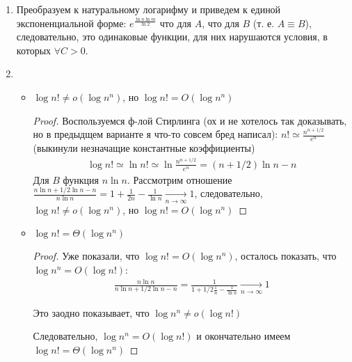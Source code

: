 \begin{enumerate}
\begin{itemize}
\begin{proof}
            Рассмотрим $\frac{2^{n/2}}{2^n} = 2^{-n/2}\xrightarrow[n\to\infty]{}0 \Longrightarrow 2^{n/2}=o(2^n) \Longrightarrow 2^n=\omega(2^{n/2})$ 
        \end{proof}
        \item $2^n=\Omega(2^{n/2})$
        \begin{proof}
            Так как $2^n=\omega(2^{n/2})$, то $2^n=\Omega(2^{n/2})$
        \end{proof}
    \end{itemize}
    \item Преобразуем к натуральному логарифму и приведем к единой экспоненциальной форме: $e^{\frac{\ln n \ln m}{\ln 2}}$ что для $A$, что для $B$ (т. е. $A\equiv B$), следовательно, это одинаковые функции, для них нарушаются условия, в которых $\forall C>0$.
    \item 
    \begin{itemize}
        \item $\log n! \neq o(\log n^n)$, но $\log n! = O(\log n^n)$
        \begin{proof}
            Воспользуемся ф-лой Стирлинга (ох и не хотелось так доказывать, но в предыдщем варианте я что-то совсем бред написал): $n! \simeq \frac{n^{n+1/2}}{e^n}$ (выкинули незначащие константные коэффициенты)
            \begin{gather}
                \log n! \simeq \ln n! \simeq \ln \frac{n^{n+1/2}}{e^n} = (n+1/2)\ln n - n
            \end{gather}
            Для $B$ функция $n\ln n$.
            Рассмотрим отношение $\frac{n\ln n + 1/2\ln n - n}{n\ln n} = 1 + \frac{1}{2n} - \frac{1}{\ln n} \xrightarrow[n\to\infty]{} 1$, следовательно, $\log n!\neq o(\log n^n)$, но $\log n! = O(\log n^n)$
        \end{proof}
        \item $\log n! = \Theta(\log n^n)$
        \begin{proof}
            Уже показали, что $\log n! = O(\log n^n)$, осталось показать, что $\log n^n = O(\log n!)$:
            \begin{gather}
                \frac{n\ln n}{n\ln n + 1/2\ln n -n} = \frac{1}{1 + 1/2\frac{1}{n} - \frac{1}{\ln n}} \xrightarrow[n\to\infty]{} 1
            \end{gather}
            \begin{remark}
                Это заодно показывает, что $\log n^n \neq o(\log n!)$
            \end{remark}
            Следовательно, $\log n^n = O(\log n!)$ и окончательно имеем $\log n! = \Theta(\log n^n)$

\end{proof}
\end{itemize}
\end{enumerate}
